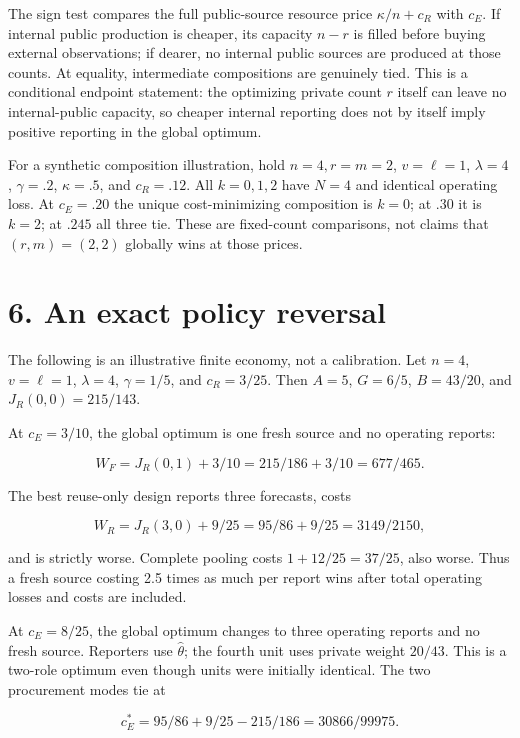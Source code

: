\documentclass[
  11pt,
]{article}
\begin{document}
The sign test compares the full public-source resource price
\(\kappa/n+c_R\) with \(c_E\). If internal public production is cheaper,
its capacity \(n-r\) is filled before buying external observations; if
dearer, no internal public sources are produced at those counts. At
equality, intermediate compositions are genuinely tied. This is a
conditional endpoint statement: the optimizing private count \(r\)
itself can leave no internal-public capacity, so cheaper internal
reporting does not by itself imply positive reporting in the global
optimum.

For a synthetic composition illustration, hold \(n=4,r=m=2\),
\(v=\ell=1\), \(\lambda=4\), \(\gamma=.2\), \(\kappa=.5\), and
\(c_R=.12\). All \(k=0,1,2\) have \(N=4\) and identical operating loss.
At \(c_E=.20\) the unique cost-minimizing composition is \(k=0\); at
\(.30\) it is \(k=2\); at \(.245\) all three tie. These are fixed-count
comparisons, not claims that \((r,m)=(2,2)\) globally wins at those
prices.

\section{6. An exact policy reversal}\label{an-exact-policy-reversal}

The following is an illustrative finite economy, not a calibration. Let
\(n=4\), \(v=\ell=1\), \(\lambda=4\), \(\gamma=1/5\), and \(c_R=3/25\).
Then \(A=5\), \(G=6/5\), \(B=43/20\), and \(J_R(0,0)=215/143\).

At \(c_E=3/10\), the global optimum is one fresh source and no operating
reports:

\[W_F=J_R(0,1)+3/10=215/186+3/10=677/465.\]

The best reuse-only design reports three forecasts, costs

\[W_R=J_R(3,0)+9/25=95/86+9/25=3149/2150,\]

and is strictly worse. Complete pooling costs \(1+12/25=37/25\), also
worse. Thus a fresh source costing 2.5 times as much per report wins
after total operating losses and costs are included.

At \(c_E=8/25\), the global optimum changes to three operating reports
and no fresh source. Reporters use \(\widehat\theta\); the fourth unit
uses private weight \(20/43\). This is a two-role optimum even though
units were initially identical. The two procurement modes tie at

\[c_E^*=95/86+9/25-215/186=30866/99975. \tag{21}\]
\end{document}
